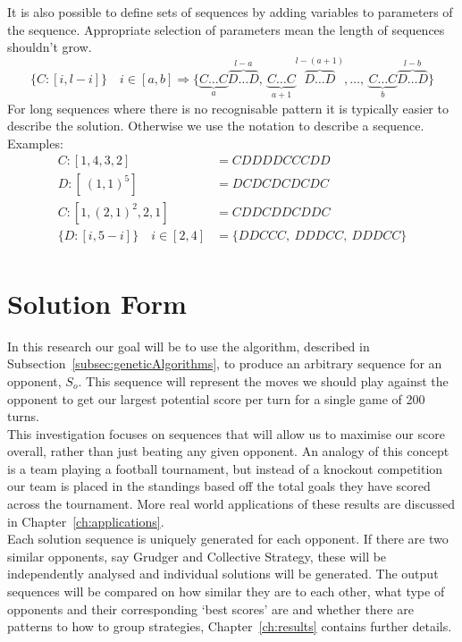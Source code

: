 It is also possible to define sets of sequences by adding variables to parameters of the sequence.
Appropriate selection of parameters mean the length of sequences shouldn't grow.
\[ \{C:[i,l-i]\} \quad i\in [a,b] \Rightarrow \{\underbrace{C\ldots C}_{a}\overbrace{D\ldots D}^{l-a},\ \underbrace{C\ldots C}_{a+1}\overbrace{D\ldots D}^{l-(a+1)},\ldots ,\ \underbrace{C\ldots C}_{b}\overbrace{D\ldots D}^{l-b}\} \]
For long sequences where there is no recognisable pattern it is typically easier to describe the solution.
Otherwise we use the notation to describe a sequence.\\
Examples:
\begin{align}
    C:[1,4,3,2] &= CDDDDCCCDD\\
    D:[\ (1,1)^{5}] &= DCDCDCDCDC\\
    C:[1,(2,1)^{2},2,1] &= CDDCDDCDDC\\
    \{D:[i,5-i]\} \quad i\in [2,4] &= \{DDCCC,\ DDDCC,\ DDDCC\}\\
\end{align}

\section{Solution Form}\label{sec:solutionForm}
In this research our goal will be to use the algorithm, described in Subsection~\ref{subsec:geneticAlgorithms}, to produce an arbitrary sequence for an opponent, \(S_o\).
This sequence will represent the moves we should play against the opponent to get our largest potential score per turn for a single game of 200 turns.\\

This investigation focuses on sequences that will allow us to maximise our score overall, rather than just beating any given opponent.
An analogy of this concept is a team playing a football tournament, but instead of a knockout competition our team is placed in the standings based off the total goals they have scored across the tournament.
More real world applications of these results are discussed in Chapter~\ref{ch:applications}.\\

Each solution sequence is uniquely generated for each opponent.
If there are two similar opponents, say Grudger and Collective Strategy, these will be independently analysed and individual solutions will be generated.
The output sequences will be compared on how similar they are to each other, what type of opponents and their corresponding `best scores' are and whether there are patterns to how to group strategies, Chapter~\ref{ch:results} contains further details.\\

